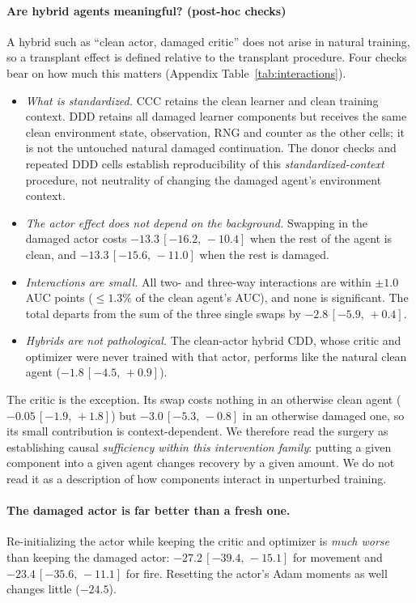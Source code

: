 \documentclass[10pt]{article} %
\newcommand{\ci}[2]{\,[#1,\,#2]}
\begin{document}
\paragraph{Are hybrid agents meaningful? (post-hoc checks)}
A hybrid such as ``clean actor, damaged critic'' does not arise in natural training, so a transplant effect is defined relative to the transplant procedure. Four checks bear on how much this matters (Appendix Table~\ref{tab:interactions}).
\begin{itemize}
\item \emph{What is standardized.} CCC retains the clean learner and clean training context. DDD retains all damaged learner components but receives the same clean environment state, observation, RNG and counter as the other cells; it is not the untouched natural damaged continuation. The donor checks and repeated DDD cells establish reproducibility of this \emph{standardized-context} procedure, not neutrality of changing the damaged agent's environment context.
\item \emph{The actor effect does not depend on the background.} Swapping in the damaged actor costs $-13.3\ci{-16.2}{-10.4}$ when the rest of the agent is clean, and $-13.3\ci{-15.6}{-11.0}$ when the rest is damaged.
\item \emph{Interactions are small.} All two- and three-way interactions are within $\pm1.0$ AUC points ($\le1.3\%$ of the clean agent's AUC), and none is significant. The total departs from the sum of the three single swaps by $-2.8\ci{-5.9}{+0.4}$.
\item \emph{Hybrids are not pathological.} The clean-actor hybrid CDD, whose critic and optimizer were never trained with that actor, performs like the natural clean agent ($-1.8\ci{-4.5}{+0.9}$).
\end{itemize}
The critic is the exception. Its swap costs nothing in an otherwise clean agent ($-0.05\ci{-1.9}{+1.8}$) but $-3.0\ci{-5.3}{-0.8}$ in an otherwise damaged one, so its small contribution is context-dependent. We therefore read the surgery as establishing causal \emph{sufficiency within this intervention family}: putting a given component into a given agent changes recovery by a given amount. We do not read it as a description of how components interact in unperturbed training.

\paragraph{The damaged actor is far better than a fresh one.}
Re-initializing the actor while keeping the critic and optimizer is \emph{much worse} than keeping the damaged actor: $-27.2\ci{-39.4}{-15.1}$ for movement and $-23.4\ci{-35.6}{-11.1}$ for fire. Resetting the actor's Adam moments as well changes little ($-24.5$).
\end{document}
